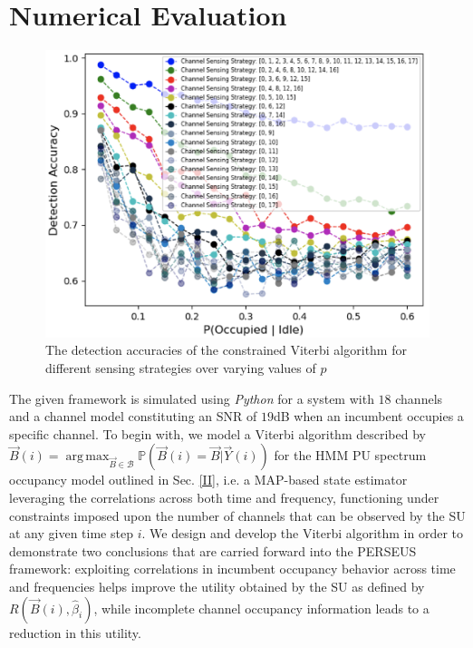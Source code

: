 \documentclass[10pt,twocolumn]{IEEEtran}
\DeclareMathOperator*{\argmax}{arg\,max}
\begin{document}
\section{Numerical Evaluation}\label{IV}
\begin{figure}
    \centering
    \includegraphics[width=1.0\linewidth]{ViterbiDetectionAccuracies.png}
    \caption{The detection accuracies of the constrained Viterbi algorithm for different sensing strategies over varying values of $p$}
    \label{fig:2}
\end{figure}

The given framework is simulated using \emph{Python} for a system with $18$ channels and a channel model constituting an SNR of $19$dB when an incumbent occupies a specific channel. To begin with, we model a Viterbi algorithm described by $\vec{B}(i){=}\argmax_{\vec{B}{\in}\mathcal{B}} \mathbb{P}(\vec{B}(i){=}\vec{B}|\vec{Y}(i))$ for the HMM PU spectrum occupancy model outlined in Sec. \ref{II}, i.e. a MAP-based state estimator leveraging the correlations across both time and frequency, functioning under constraints imposed upon the number of channels that can be observed by the SU at any given time step $i$. We design and develop the Viterbi algorithm in order to demonstrate two conclusions that are carried forward into the PERSEUS framework: exploiting correlations in incumbent occupancy behavior across time and frequencies helps improve the utility obtained by the SU as defined by $R(\vec{B}(i), \hat{\beta}_{i})$, while incomplete channel occupancy information leads to a reduction in this utility. 
\end{document}
